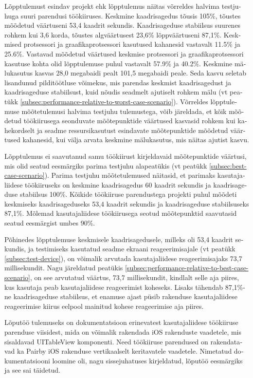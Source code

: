 \documentclass[a4paper,12pt]{article}
\begin{document}
\begin{otherlanguage}{estonian}
Lõpptulemust esindav projekt ehk lõpptulemus näitas võrreldes halvima testjuhuga suuri parendusi töökiiruses. Keskmine kaadrisagedus tõusis 105\%, tõustes mõõdetud väärtuseni 53,4 kaadrit sekundis. Kaadrisageduse stabiilsus suurenes rohkem kui 3,6 korda, tõustes algväärtusest 23,6\% lõppväärtuseni 87,1\%. Keskmised protsessori ja graafikaprotsessori kasutused kahanesid vastavalt 11.5\% ja 25.6\%. Vastavad mõõdetud väärtused keskmise protsessori ja graafikaprotsessori kasutuse kohta olid lõpptulemuse puhul vastavalt 57.9\% ja 40.2\%. Keskmine mälukasutus kasvas 28,0 megabaidi pealt 101,5 megabaidi peale. Seda kasvu seletab lisandunud pilditöötluse võimekus, mis parendas keskmist kaadrisagedust ja kaadrisageduse stabiilsust, kuid nõudis seadmelt ajutiselt rohkem mälu (vt peatükk \ref{subsec:performance-relative-to-worst-case-scenario}). Võrreldes lõpptulemuse mõõtetulemusi halvima testjuhu tulemustega, võib järeldada, et kõik mõõdetud töökiirusega seonduvate mõõtepunktide väärtused kasvasid rohkem kui kahekordselt ja seadme ressursikasutust esindavate mõõtepunktide mõõdetud väärtused kahanesid, kui välja arvata keskmine mälukasutus, mis näitas ajutist kasvu.

Lõpptulemus ei saavutanud samu töökiirust kirjeldavaid mõõtepunktide väärtusi, mis olid seatud eesmärgiks parima testjuhu alapeatükis (vt peatükk \ref{subsec:best-case-scenario}). Parima testjuhu mõõtetulemused näitasid, et parimaks kasutajaliidese töökiiruseks on keskmine kaadrisagedus 60 kaadrit sekundis ja kaadrisageduse stabiilsus 100\%. Kõikide töökiiruse parendustega projekti puhul mõõdeti keskmiseks kaadrisageduseks 53,4 kaadrit sekundis ja kaadrisageduse stabiilsuseks 87,1\%. Mõlemad kasutajaliidese töökiirusega seotud mõõtepunktid saavutasid seatud eesmärgist umbes 90\%.

Põhinedes lõpptulemuse keskmisele kaadrisagedusele, milleks oli 53,4 kaadrit sekundis, ja testimiseks kasutatud seadme ekraani reageerimisajale (vt peatükk \ref{subsec:test-device}), on võimalik arvutada kasutajaliidese reageerimisajaks 73,7 millisekundit. Nagu järeldatud peatükis \ref{subsec:performance-relative-to-best-case-scenario}, on see arvutatud väärtus, 73,7 millisekundit, kindlalt selle aja piires, kus kasutaja peab kasutajaliidese reageerimist koheseks. Lisaks tähendab 87,1\%-ne kaadrisageduse stabiilsus, et enamuse ajast püsib rakenduse kasutajaliidese reageerimise kiirus eelpool mainitud kohese reageerimise aja piires.

Lõputöö tulemuseks on dokumentatsioon erinevatest kasutajaliidese töökiiruse parenduse viisidest, mida on võimalik rakendada iOS rakenduste vaadetele, mis sisaldavad UITableView komponenti. Need töökiiruse parendused on rakendatavad ka Pairby iOS rakenduse vertikaalselt keritavatele vaadetele. Nimetatud dokumentatsiooni loomine oli, nagu sissejuhatuses kirjeldatud, lõputöö eesmärgiks ja see sai täidetud.
\end{otherlanguage}
\end{document}
